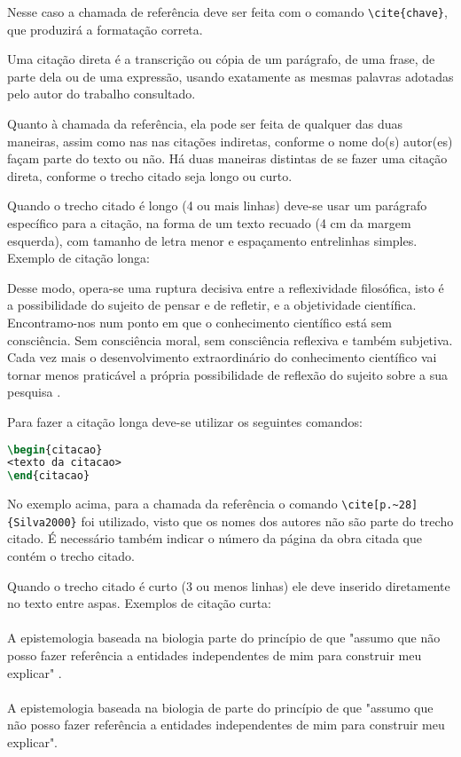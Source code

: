 Nesse caso a chamada de referência deve ser feita com o comando \verb|\cite{chave}|, que produzirá a formatação correta.

Uma citação direta é a transcrição ou cópia de um parágrafo, de uma frase, de parte dela ou de uma expressão, usando exatamente as mesmas palavras adotadas pelo autor do trabalho consultado.

Quanto à chamada da referência, ela pode ser feita de qualquer das duas maneiras, assim como nas nas citações indiretas, conforme o nome do(s) autor(es) façam parte do texto ou não. Há duas maneiras distintas de se fazer uma citação direta, conforme o trecho citado seja longo ou curto.

Quando o trecho citado é longo (4 ou mais linhas) deve-se usar um parágrafo específico para a citação, na forma de um texto recuado (4 cm da margem esquerda), com tamanho de letra menor e espaçamento entrelinhas simples. Exemplo de citação longa:
\\\begin{citacao}
Desse modo, opera-se uma ruptura decisiva entre a reflexividade filosófica, isto é a possibilidade do sujeito de pensar e de refletir, e a objetividade científica. Encontramo-nos num ponto em que o conhecimento científico está sem consciência. Sem consciência moral, sem consciência reflexiva e também subjetiva. Cada vez mais o desenvolvimento extraordinário do conhecimento científico vai tornar menos praticável a própria possibilidade de reflexão do sujeito sobre a sua pesquisa \cite[p.~28]{Silva2000}.
\end{citacao}

Para fazer a citação longa deve-se utilizar os seguintes comandos:
\begin{lstlisting}[language=tex]
\begin{citacao}
<texto da citacao>
\end{citacao}
\end{lstlisting}

No exemplo acima, para a chamada da referência o comando \verb|\cite[p.~28]{Silva2000}| foi utilizado, visto que os nomes dos autores não são parte do trecho citado. É necessário também indicar o número da página da obra citada que contém o trecho citado.

Quando o trecho citado é curto (3 ou menos linhas) ele deve inserido diretamente no texto entre aspas. Exemplos de citação curta:\\
\\A epistemologia baseada na biologia parte do princípio de que "assumo que não posso fazer referência a entidades independentes de mim para construir meu explicar" \cite[p.~35]{Maturana2003}.\\
\\A epistemologia baseada na biologia de  parte do princípio de que "assumo que não posso fazer referência a entidades independentes de mim para construir meu explicar".\\

